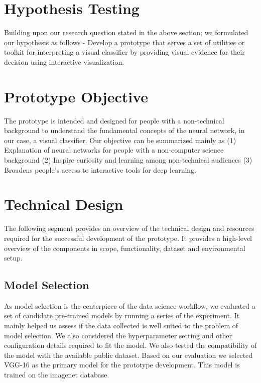 \section{Hypothesis Testing}

Building upon our research question stated in the above section; we formulated our hypothesis as follows -  Develop a prototype that serves a set of utilities or toolkit for interpreting a visual classifier by providing visual evidence for their decision using interactive visualization.

\section{Prototype Objective}

The prototype is intended and designed for people with a non-technical background to understand the fundamental concepts of the neural network, in our case, a visual classifier. Our objective can be summarized mainly as (1) Explanation of neural networks for people with a non-computer science background (2) Inspire curiosity and learning among non-technical audiences  (3) Broadens people's access to interactive tools for deep learning.

\section{Technical Design}
The following segment provides an overview of the technical design and resources required for the successful development of the prototype. It provides a high-level overview of the components in scope, functionality, dataset and environmental setup.

\subsection{Model Selection}

As model selection is the centerpiece of the data science workflow, we evaluated a set of candidate pre-trained models by running a series of the experiment. It mainly helped us assess if the data collected is well suited to the problem of model selection. We also considered the hyperparameter setting and other configuration details required to fit the model. We also tested the compatibility of the model with the available public dataset. Based on our evaluation we selected VGG-16 as the primary model for the prototype development. This model is trained on the imagenet database.

